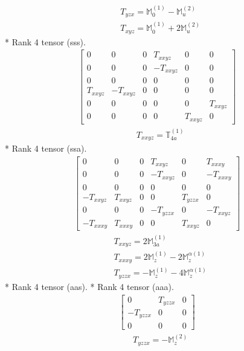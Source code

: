 \documentclass[fleqn,8pt,landscape]{jsarticle}
\begin{document}
\begin{align*}
& T_{yzx} = \mathbb{M}_{0}^{(1)} - \mathbb{M}_{u}^{(2)} \\
& T_{xyz} = \mathbb{M}_{0}^{(1)} + 2 \mathbb{M}_{u}^{(2)}
\end{align*}
* Rank 4 tensor (sss).
\begin{align*}
\begin{bmatrix} 0 & 0 & 0 & T_{xxyz} & 0 & 0 \\ 0 & 0 & 0 & - T_{xxyz} & 0 & 0 \\ 0 & 0 & 0 & 0 & 0 & 0 \\ T_{xxyz} & - T_{xxyz} & 0 & 0 & 0 & 0 \\ 0 & 0 & 0 & 0 & 0 & T_{xxyz} \\ 0 & 0 & 0 & 0 & T_{xxyz} & 0 \end{bmatrix}
\end{align*}
\begin{align*}
& T_{xxyz} = \mathbb{T}_{4a}^{(1)}
\end{align*}
* Rank 4 tensor (ssa).
\begin{align*}
\begin{bmatrix} 0 & 0 & 0 & T_{xxyz} & 0 & T_{xxxy} \\ 0 & 0 & 0 & - T_{xxyz} & 0 & - T_{xxxy} \\ 0 & 0 & 0 & 0 & 0 & 0 \\ - T_{xxyz} & T_{xxyz} & 0 & 0 & T_{yzzx} & 0 \\ 0 & 0 & 0 & - T_{yzzx} & 0 & - T_{xxyz} \\ - T_{xxxy} & T_{xxxy} & 0 & 0 & T_{xxyz} & 0 \end{bmatrix}
\end{align*}
\begin{align*}
& T_{xxyz} = 2 \mathbb{M}_{3a}^{(1)} \\
& T_{xxxy} = 2 \mathbb{M}_{z}^{(1)} - 2 \mathbb{M}_{z}^{\alpha(1)} \\
& T_{yzzx} = - \mathbb{M}_{z}^{(1)} - 4 \mathbb{M}_{z}^{\alpha(1)}
\end{align*}
* Rank 4 tensor (aas).
* Rank 4 tensor (aaa).
\begin{align*}
\begin{bmatrix} 0 & T_{yzzx} & 0 \\ - T_{yzzx} & 0 & 0 \\ 0 & 0 & 0 \end{bmatrix}
\end{align*}
\begin{align*}
& T_{yzzx} = - \mathbb{M}_{z}^{(2)}
\end{align*}
\end{document}
